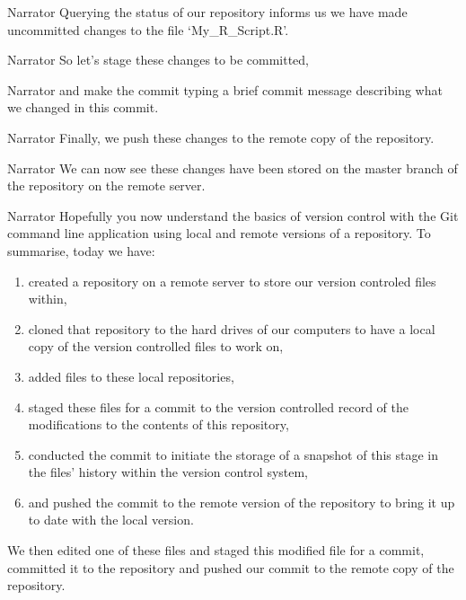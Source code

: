 \documentclass{screenplay} %
\begin{document}
\begin{dialogue}{Narrator}
Querying the status of our repository informs us we have made uncommitted changes to the file `My\_R\_Script.R'.
\end{dialogue}

\begin{dialogue}{Narrator}
So let's stage these changes to be committed,
\end{dialogue}

\begin{dialogue}{Narrator}
and make the commit typing a brief commit message describing what we changed in this commit.
\end{dialogue}

\begin{dialogue}{Narrator}
Finally, we push these changes to the remote copy of the repository.
\end{dialogue}

\begin{dialogue}{Narrator}
We can now see these changes have been stored on the master branch of the repository on the remote server.
\end{dialogue}

\begin{dialogue}{Narrator}
Hopefully you now understand the basics of version control with the Git command line application using local and remote versions of a repository. %
To summarise, today we have: \begin{enumerate} 
\item created a repository on a remote server to store our version controled files within, 
\item cloned that repository to the hard drives of our computers to have a local copy of the version controlled files to work on, 
\item added files to these local repositories, 
\item staged these files for a commit to the version controlled record of the modifications to the contents of this repository,
\item conducted the commit to initiate the storage of a snapshot of this stage in the files' history within the version control system,
\item and pushed the commit to the remote version of the repository to bring it up to date with the local version.
\end{enumerate}
We then edited one of these files and staged this modified file for a commit, committed it to the repository and pushed our commit to the remote copy of the repository.
\end{dialogue}
\end{document}
